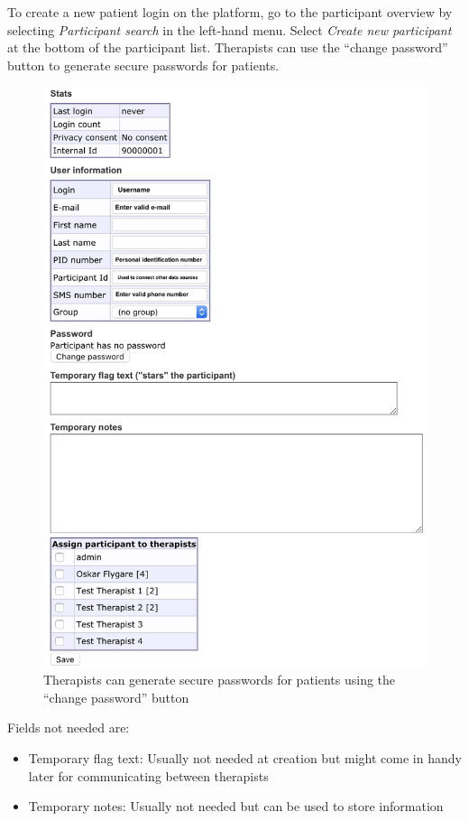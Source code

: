 \documentclass[]{book}
\providecommand{\tightlist}{%
  \setlength{\itemsep}{0pt}\setlength{\parskip}{0pt}}
\theoremstyle{definition}
\theoremstyle{definition}
\theoremstyle{definition}
\theoremstyle{remark}
\begin{document}
To create a new patient login on the platform, go to the participant
overview by selecting \emph{Participant search} in the left-hand menu.
Select \emph{Create new participant} at the bottom of the participant
list. Therapists can use the ``change password'' button to generate
secure passwords for patients.

\begin{figure}
\centering
\includegraphics{images/new-participant.png}
\caption{Therapists can generate secure passwords for patients using the
``change password'' button}
\end{figure}

Fields not needed are:

\begin{itemize}
\tightlist
\item
  Temporary flag text: Usually not needed at creation but might come in
  handy later for communicating between therapists
\item
  Temporary notes: Usually not needed but can be used to store
  information
\end{itemize}
\end{document}
